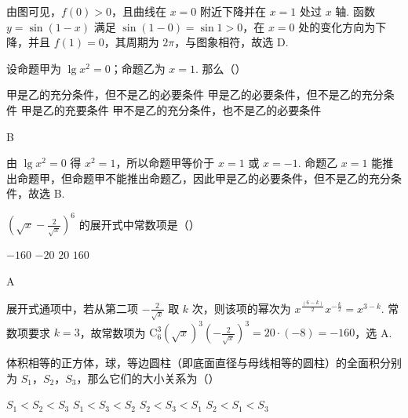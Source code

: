 \begin{solution}
由图可见，\(f(0)>0\)，且曲线在 \(x=0\) 附近下降并在 \(x=1\) 处过 \(x\) 轴. 函数 \(y=\sin(1-x)\) 满足 \(\sin(1-0)=\sin1>0\)，在 \(x=0\) 处的变化方向为下降，并且 \(f(1)=0\)，其周期为 \(2\pi\)，与图象相符，故选 D.
\end{solution}

\begin{problem}
设命题甲为 \(\lg x^2=0\)；命题乙为 \(x=1\). 那么（\quad）

\choices
    {甲是乙的充分条件，但不是乙的必要条件}
    {甲是乙的必要条件，但不是乙的充分条件}
    {甲是乙的充要条件}
    {甲不是乙的充分条件，也不是乙的必要条件}

\end{problem}

\begin{answer}
B
\end{answer}

\begin{solution}
由 \(\lg x^2=0\) 得 \(x^2=1\)，所以命题甲等价于 \(x=1\) 或 \(x=-1\). 命题乙 \(x=1\) 能推出命题甲，但命题甲不能推出命题乙，因此甲是乙的必要条件，但不是乙的充分条件，故选 B.
\end{solution}

\begin{problem}
\(\left(\sqrt{x}-\frac{2}{\sqrt{x}}\right)^6\) 的展开式中常数项是（\quad）

\choices
    {\(-160\)}
    {\(-20\)}
    {\(20\)}
    {\(160\)}

\end{problem}

\begin{answer}
A
\end{answer}

\begin{solution}
展开式通项中，若从第二项 \(-\frac{2}{\sqrt{x}}\) 取 \(k\) 次，则该项的幂次为 \(x^{\frac{(6-k)}{2}}x^{-\frac{k}{2}}=x^{3-k}\). 常数项要求 \(k=3\)，故常数项为 \(\mathrm C_6^3(\sqrt{x})^3\left(-\frac{2}{\sqrt{x}}\right)^3=20\cdot(-8)=-160\)，选 A.
\end{solution}

\begin{problem}
体积相等的正方体，球，等边圆柱（即底面直径与母线相等的圆柱）的全面积分别为 \(S_1\)，\(S_2\)，\(S_3\)，那么它们的大小关系为（\quad）

\choices
    {\(S_1<S_2<S_3\)}
    {\(S_1<S_3<S_2\)}
    {\(S_2<S_3<S_1\)}
    {\(S_2<S_1<S_3\)}

\end{problem}

